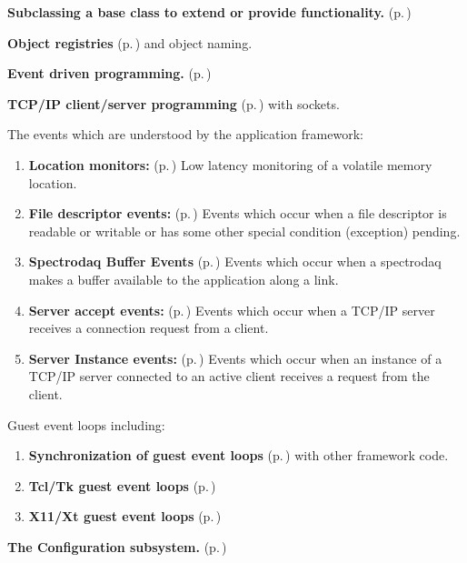 \begin{CompactItemize}
\item 
{\bf Subclassing  a base class to extend or provide functionality.} {\rm (p.\,\pageref{Subclassing})}\item 
{\bf Object registries} {\rm (p.\,\pageref{Registration})} and object naming.\item 
{\bf Event driven programming.} {\rm (p.\,\pageref{EventDriven})}\item 
{\bf TCP/IP client/server programming} {\rm (p.\,\pageref{TCPIP})}  with sockets.\item 
The events which are understood by the application framework:\begin{enumerate}
\item 
{\bf Location monitors:} {\rm (p.\,\pageref{LocationMonitors})} Low latency monitoring of a volatile memory location.\item 
{\bf File descriptor events:} {\rm (p.\,\pageref{FileEvents})} Events which occur when a file descriptor is readable or writable or has some other special condition (exception) pending.\item 
{\bf Spectrodaq Buffer Events} {\rm (p.\,\pageref{BufferEvent})} Events which occur when a spectrodaq makes a buffer available to the application along a link.\item 
{\bf Server accept events:} {\rm (p.\,\pageref{ServerEvent})} Events which occur when a TCP/IP server receives a connection request from a client.\item 
{\bf Server Instance events:} {\rm (p.\,\pageref{SocketEvents})} Events which occur when an instance of a TCP/IP server connected to an active client receives a request from the client.\end{enumerate}
\item 
Guest event loops including:\begin{enumerate}
\item 
{\bf Synchronization of guest event loops} {\rm (p.\,\pageref{Synchronization})} with other framework code.\item 
{\bf Tcl/Tk guest event loops} {\rm (p.\,\pageref{TCLGuests})}\item 
{\bf X11/Xt guest event loops} {\rm (p.\,\pageref{XtGuests})}\end{enumerate}
\item 
{\bf The Configuration subsystem.} {\rm (p.\,\pageref{configsys})}\end{CompactItemize}
